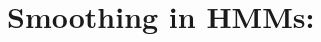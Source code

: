 \documentclass[10pt,\jkfside,a4paper]{article}
\begin{document}
\begin{enumerate}



\end{enumerate}

\section*{Smoothing in HMMs:}
\end{document}

